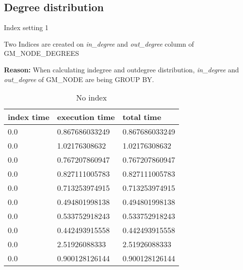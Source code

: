 \subsection{Degree distribution}
\begin{itemize*}
\item{Index setting 1}
\par Two Indices are created on \textit{in\_degree} and \textit{out\_degree} column of GM\_NODE\_DEGREES
\par \textbf{Reason:} When calculating indegree and outdegree distribution, \textit{in\_degree} and \textit{out\_degree} of GM\_NODE are being GROUP BY.

\begin{table}[H]
\begin{center}
\begin{tabular}{|l|l|l|}
\hline
index time & execution time & total time     \\ \hline
0.0        & 0.867686033249 & 0.867686033249 \\ \hline
0.0        & 1.02176308632  & 1.02176308632  \\ \hline
0.0        & 0.767207860947 & 0.767207860947 \\ \hline
0.0        & 0.827111005783 & 0.827111005783 \\ \hline
0.0        & 0.713253974915 & 0.713253974915 \\ \hline
0.0        & 0.494801998138 & 0.494801998138 \\ \hline
0.0        & 0.533752918243 & 0.533752918243 \\ \hline
0.0        & 0.442493915558 & 0.442493915558 \\ \hline
0.0        & 2.51926088333  & 2.51926088333  \\ \hline
0.0        & 0.900128126144 & 0.900128126144 \\ \hline
\end{tabular}
\end{center}
\caption{No index}
\end{table}


\end{itemize*}

